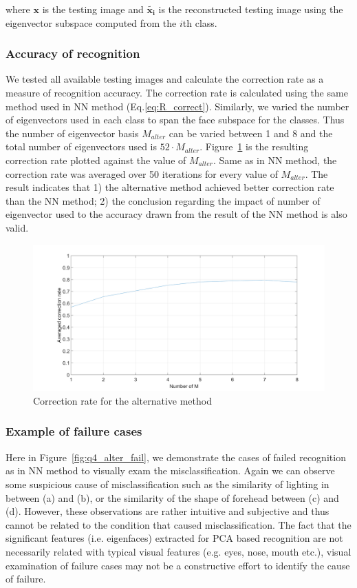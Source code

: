 \documentclass[10pt,twocolumn,letterpaper]{article}
\begin{document}
where $\boldsymbol{x}$ is the testing image and $\boldsymbol{\widetilde{x_i}}$ is the reconstructed testing image using the eigenvector subspace computed from the $i$th class.

\subsubsection{Accuracy of recognition}
We tested all available testing images and calculate the correction rate as a measure of recognition accuracy. The correction rate is calculated using the same method used in NN method (Eq.\ref{eq:R_correct}). Similarly, we varied the number of eigenvectors used in each class to span the face subspace for the classes. Thus the number of eigenvector basis $M_{alter}$ can be varied between 1 and 8 and the total number of eigenvectors used is $52 \cdot M_{alter}$. Figure~\ref{fig:q4_alter_rate} is the resulting correction rate plotted against the value of $M_{alter}$. Same as in NN method, the correction rate was averaged over 50 iterations for every value of $M_{alter}$. The result indicates that 1) the alternative method achieved better correction rate than the NN method; 2) the conclusion regarding the impact of number of eigenvector used to the accuracy drawn from the result of the NN method is also valid. 


	\begin{figure}
		\begin{center}
			\includegraphics[width=0.9\linewidth]{correctRate_alter}
			\caption{Correction rate for the alternative method}
			\label{fig:q4_alter_rate}
		\end{center}
	\end{figure}


\subsubsection{Example of failure cases}
Here in Figure~\ref{fig:q4_alter_fail}, we demonstrate the cases of failed recognition as in NN method to visually exam the misclassification. Again we can observe some suspicious cause of misclassification such as the similarity of lighting in between (a) and (b), or the similarity of the shape of forehead between (c) and (d). However, these observations are rather intuitive and subjective and thus cannot be related to the condition that caused misclassification. The fact that the significant features (i.e. eigenfaces) extracted for PCA based recognition are not necessarily related with typical visual features (e.g. eyes, nose, mouth etc.), visual examination of failure cases may not be a constructive effort to identify the cause of failure.
\end{document}
